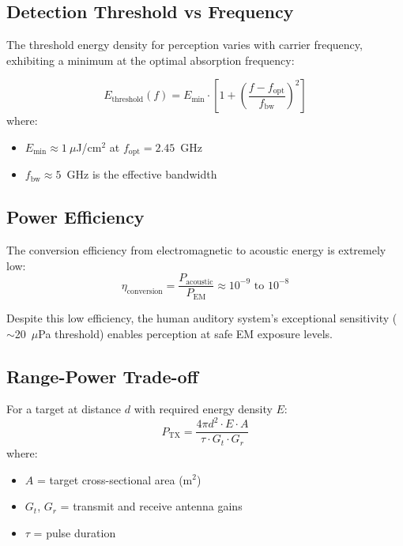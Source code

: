 \subsection{Detection Threshold vs Frequency}

The threshold energy density for perception varies with carrier frequency, exhibiting a minimum at the optimal absorption frequency:

\begin{equation}
E_{\text{threshold}}(f) = E_{\text{min}} \cdot \left[1 + \left(\frac{f - f_{\text{opt}}}{f_{\text{bw}}}\right)^2\right]
\end{equation}
where:
\begin{itemize}
\item $E_{\text{min}} \approx 1~\mu$J/cm$^2$ at $f_{\text{opt}} = 2.45$~GHz
\item $f_{\text{bw}} \approx 5$~GHz is the effective bandwidth
\end{itemize}

\subsection{Power Efficiency}

The conversion efficiency from electromagnetic to acoustic energy is extremely low:
\begin{equation}
\eta_{\text{conversion}} = \frac{P_{\text{acoustic}}}{P_{\text{EM}}} \approx 10^{-9} \text{ to } 10^{-8}
\end{equation}

Despite this low efficiency, the human auditory system's exceptional sensitivity ($\sim$20~$\mu$Pa threshold) enables perception at safe EM exposure levels.

\subsection{Range-Power Trade-off}

For a target at distance $d$ with required energy density $E$:
\begin{equation}
P_{\text{TX}} = \frac{4\pi d^2 \cdot E \cdot A}{\tau \cdot G_t \cdot G_r}
\end{equation}
where:
\begin{itemize}
\item $A$ = target cross-sectional area (m$^2$)
\item $G_t$, $G_r$ = transmit and receive antenna gains
\item $\tau$ = pulse duration
\end{itemize}

